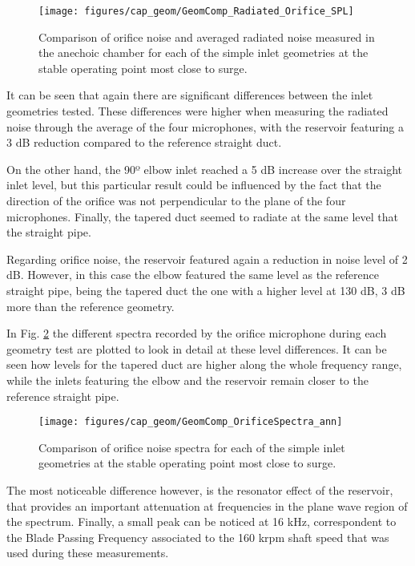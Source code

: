 \begin{figure}[h!]
\centering
\texttt{[image: figures/cap\_geom/GeomComp\_Radiated\_Orifice\_SPL]}
\caption{Comparison of orifice noise and averaged radiated noise measured in the anechoic chamber for each of the simple inlet geometries at the stable operating point most close to surge.}
\label{fig:Radiated_Orifice_SPL_simple_geom}
\end{figure}

It can be seen that again there are significant differences between the inlet geometries tested. These differences were higher when measuring the radiated noise through the average of the four microphones, with the reservoir featuring a 3 dB reduction compared to the reference straight duct. 

On the other hand, the 90º elbow inlet reached a 5 dB increase over the straight inlet level, but this particular result could be influenced by the fact that the direction of the orifice was not perpendicular to the plane of the four microphones. Finally, the tapered duct seemed to radiate at the same level that the straight pipe.

Regarding orifice noise, the reservoir featured again a reduction in noise level of 2 dB. However, in this case the elbow featured the same level as the reference straight pipe, being the tapered duct the one with a higher level at 130 dB, 3 dB more than the reference geometry.

In Fig. \ref{fig:GeomComp_OrificeSpectra_ann} the different spectra recorded by the orifice microphone during each geometry test are plotted to look in detail at these level differences. It can be seen how levels for the tapered duct are higher along the whole frequency range, while the inlets featuring the elbow and the reservoir remain closer to the reference straight pipe.

\begin{figure}[h!]
\centering
\texttt{[image: figures/cap\_geom/GeomComp\_OrificeSpectra\_ann]}
\caption{Comparison of orifice noise spectra for each of the simple inlet geometries at the stable operating point most close to surge.}
\label{fig:GeomComp_OrificeSpectra_ann}
\end{figure}

The most noticeable difference however, is the resonator effect of the reservoir, that provides an important attenuation at frequencies in the plane wave region of the spectrum. Finally, a small peak can be noticed at 16 kHz, correspondent to the Blade Passing Frequency  associated to the 160 krpm shaft speed that was used during these measurements.


